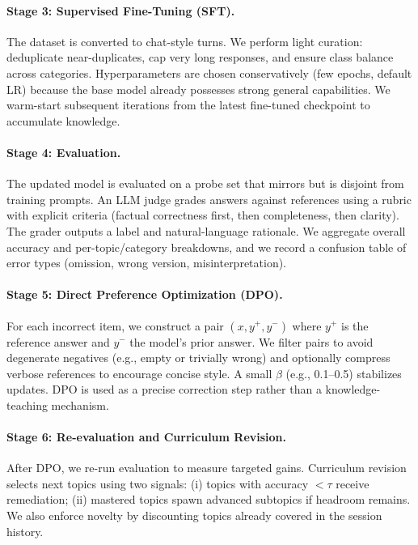 \documentclass[11pt]{article}
\begin{document}
\paragraph{Stage 3: Supervised Fine-Tuning (SFT).} The dataset is converted to chat-style turns. We perform light curation: deduplicate near-duplicates, cap very long responses, and ensure class balance across categories. Hyperparameters are chosen conservatively (few epochs, default LR) because the base model already possesses strong general capabilities. We warm-start subsequent iterations from the latest fine-tuned checkpoint to accumulate knowledge.

\paragraph{Stage 4: Evaluation.} The updated model is evaluated on a probe set that mirrors but is disjoint from training prompts. An LLM judge grades answers against references using a rubric with explicit criteria (factual correctness first, then completeness, then clarity). The grader outputs a label and natural-language rationale. We aggregate overall accuracy and per-topic/category breakdowns, and we record a confusion table of error types (omission, wrong version, misinterpretation).

\paragraph{Stage 5: Direct Preference Optimization (DPO).} For each incorrect item, we construct a pair $(x,y^+,y^-)$ where $y^+$ is the reference answer and $y^-$ the model's prior answer. We filter pairs to avoid degenerate negatives (e.g., empty or trivially wrong) and optionally compress verbose references to encourage concise style. A small $\beta$ (e.g., 0.1--0.5) stabilizes updates. DPO is used as a precise correction step rather than a knowledge-teaching mechanism.

\paragraph{Stage 6: Re-evaluation and Curriculum Revision.} After DPO, we re-run evaluation to measure targeted gains. Curriculum revision selects next topics using two signals: (i) topics with accuracy $<\tau$ receive remediation; (ii) mastered topics spawn advanced subtopics if headroom remains. We also enforce novelty by discounting topics already covered in the session history.
\end{document}
